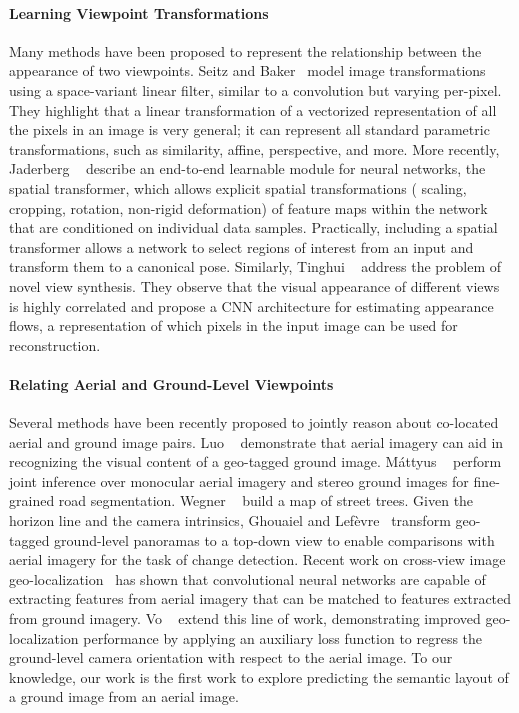 \paragraph{Learning Viewpoint Transformations}
Many methods have been proposed to represent the relationship between
the appearance of two viewpoints. Seitz and Baker~\cite{filterflow}
model image transformations using a space-variant linear filter,
similar to a convolution but varying per-pixel. They highlight that a
linear transformation of a vectorized representation of all the pixels
in an image is very general; it can represent all standard parametric
transformations, such as similarity, affine, perspective, and more.
More recently, Jaderberg \etal~\cite{jaderberg2015spatial} describe an
end-to-end learnable module for neural networks, the spatial
transformer, which allows explicit spatial transformations (\eg
scaling, cropping, rotation, non-rigid deformation) of feature maps
within the network that are conditioned on individual data samples.
Practically, including a spatial transformer allows a network to
select regions of interest from an input and transform them to a
canonical pose. Similarly, Tinghui \etal~\cite{tinghui2016flow}
address the problem of novel view synthesis. They observe that the
visual appearance of different views is highly correlated and propose
a CNN architecture for estimating appearance flows, a representation
of which pixels in the input image can be used for reconstruction. 

\paragraph{Relating Aerial and Ground-Level Viewpoints}
Several methods have been recently proposed to jointly reason about
co-located aerial and ground image pairs. Luo
\etal~\cite{luo2008event} demonstrate that aerial imagery can aid
in recognizing the visual content of a geo-tagged ground image.
M{\'a}ttyus \etal~\cite{mattyus2016hd} perform joint inference over
monocular aerial imagery and stereo ground images for fine-grained
road segmentation. Wegner \etal~\cite{wegner2016cataloging} build a
map of street trees. Given the horizon line and the camera intrinsics,
Ghouaiel and Lef{\`e}vre~\cite{ghouaiel2016coupling} transform
geo-tagged ground-level panoramas to a top-down view to enable
comparisons with aerial imagery for the task of change detection.
Recent work on cross-view image
geo-localization~\cite{lin2013cross,lin2015learning,workman2015geocnn,workman2015wide}
 has shown that convolutional neural
networks are capable of extracting features from aerial imagery
that can be matched to features extracted from ground imagery.
Vo \etal~\cite{vo2016localizing} extend this line of work,
demonstrating improved geo-localization performance by applying an
auxiliary loss function to regress the ground-level camera orientation
with respect to the aerial image. To our knowledge, our work is the
first work to explore predicting the semantic layout of a ground
image from an aerial image.

